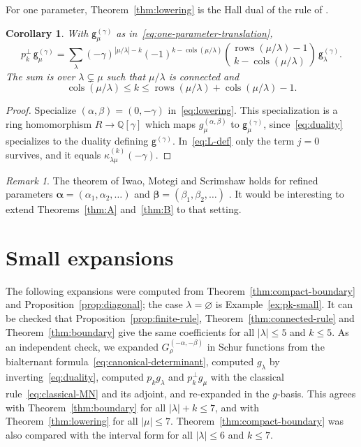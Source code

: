 \documentclass[11pt]{amsart}
\numberwithin{equation}{section}
\newtheorem{corollary}[theorem]{Corollary}
\theoremstyle{definition}
\theoremstyle{remark}
\newtheorem{remark}[theorem]{Remark}
\newcommand{\rows}{\operatorname{rows}}
\newcommand{\cols}{\operatorname{cols}}
\newcommand{\bbeta}{\boldsymbol\beta}
\newcommand{\balpha}{\boldsymbol\alpha}
\newcommand{\one}{\varnothing}
\newcommand{\sg}{\mathsf g}
\newcommand{\QQ}{\mathbb Q}
\begin{document}
For one parameter, Theorem~\ref{thm:lowering} is the Hall dual of the rule of \cite{NHST}.

\begin{corollary}
\label{cor:lowering-one}
With $\sg^{(\gamma)}_\mu$ as in~\eqref{eq:one-parameter-translation},
\[
 p_k^\perp\,\sg^{(\gamma)}_\mu
 =\sum_{\lambda}(-\gamma)^{|\mu/\lambda|-k}(-1)^{k-\cols(\mu/\lambda)}
 \binom{\rows(\mu/\lambda)-1}{k-\cols(\mu/\lambda)}\,\sg^{(\gamma)}_\lambda.
\]
The sum is over $\lambda\subsetneq\mu$ such that $\mu/\lambda$ is
connected and
\[
 \cols(\mu/\lambda)\leq k\leq
 \rows(\mu/\lambda)+\cols(\mu/\lambda)-1.
\] 
\end{corollary}

\begin{proof}
Specialize $(\alpha,\beta)=(0,-\gamma)$ in~\eqref{eq:lowering}. This
specialization is a ring homomorphism $R\to\QQ[\gamma]$ which maps
$g^{(\alpha,\beta)}_\mu$ to $\sg^{(\gamma)}_\mu$, since~\eqref{eq:duality}
specializes to the duality defining $\sg^{(\gamma)}$. In~\eqref{eq:L-def}
only the term $j=0$ survives, and it equals $\kappa^{(k)}_{\lambda\mu}(-\gamma)$.
\end{proof}



\begin{remark}\label{rem:refined}
The theorem of Iwao, Motegi and Scrimshaw holds for refined parameters
$\balpha=(\alpha_1,\alpha_2,\dots)$ and $\bbeta=(\beta_1,\beta_2,\dots)$
\cite{IMS25}. It would be interesting to extend
Theorems~\ref{thm:A} and~\ref{thm:B} to that setting.
\end{remark}

\appendix

\section{Small expansions}\label{app:tables}

The following expansions were computed from Theorem~\ref{thm:compact-boundary}
and Proposition~\ref{prop:diagonal}; the case $\lambda=\one$ is
Example~\ref{ex:pk-small}. It can be checked that
Proposition~\ref{prop:finite-rule}, Theorem~\ref{thm:connected-rule} and
Theorem~\ref{thm:boundary} give the same coefficients for all $|\lambda|\leq5$
and $k\leq5$. As an independent check, we expanded $G^{(-\alpha,-\beta)}_\rho$
in Schur functions from the bialternant
formula~\eqref{eq:canonical-determinant}, computed $g_\lambda$ by
inverting~\eqref{eq:duality}, computed $p_kg_\lambda$ and $p_k^\perp g_\mu$ with
the classical rule~\eqref{eq:classical-MN} and its adjoint, and re-expanded
in the $g$-basis. This agrees with Theorem~\ref{thm:boundary} for all
$|\lambda|+k\leq7$, and with Theorem~\ref{thm:lowering} for all $|\mu|\leq7$. Theorem~\ref{thm:compact-boundary} was also compared with the interval form
for all $|\lambda|\leq6$ and $k\leq7$.
\end{document}

